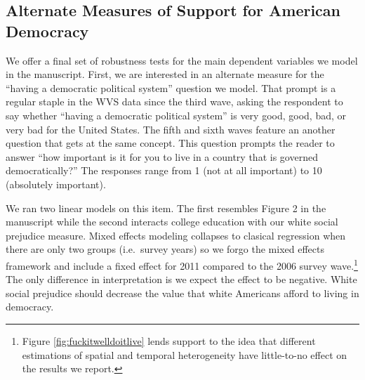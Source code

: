 \documentclass[11pt,]{article}
\begin{document}
\hypertarget{alternate-measures-of-support-for-american-democracy}{%
\subsection{Alternate Measures of Support for American
Democracy}\label{alternate-measures-of-support-for-american-democracy}}

We offer a final set of robustness tests for the main dependent
variables we model in the manuscript. First, we are interested in an
alternate measure for the ``having a democratic political system''
question we model. That prompt is a regular staple in the WVS data since
the third wave, asking the respondent to say whether ``having a
democratic political system'' is very good, good, bad, or very bad for
the United States. The fifth and sixth waves feature an another question
that gets at the same concept. This question prompts the reader to
answer ``how important is it for you to live in a country that is
governed democratically?'' The responses range from 1 (not at all
important) to 10 (absolutely important).

We ran two linear models on this item. The first resembles Figure 2 in
the manuscript while the second interacts college education with our
white social prejudice measure. Mixed effects modeling collapses to
clasical regression when there are only two groups (i.e.~survey years)
so we forgo the mixed effects framework and include a fixed effect for
2011 compared to the 2006 survey wave.\footnote{Figure
  \ref{fig:fuckitwelldoitlive} lends support to the idea that different
  estimations of spatial and temporal heterogeneity have little-to-no
  effect on the results we report.} The only difference in
interpretation is we expect the effect to be negative. White social
prejudice should decrease the value that white Americans afford to
living in democracy.

 
  \providecommand{\huxb}[2]{\arrayrulecolor[RGB]{#1}\global\arrayrulewidth=#2pt}
  \providecommand{\huxvb}[2]{\color[RGB]{#1}\vrule width #2pt}
  \providecommand{\huxtpad}[1]{\rule{0pt}{\baselineskip+#1}}
  \providecommand{\huxbpad}[1]{\rule[-#1]{0pt}{#1}}
\end{document}
